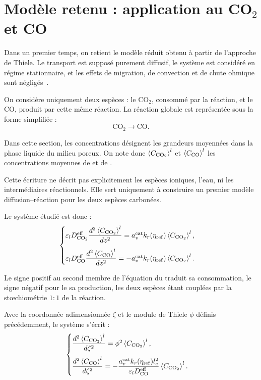 \section*{Modèle retenu : application au CO$_2$ et CO}

Dans un premier temps, on retient le modèle réduit obtenu à partir de
l'approche de Thiele. Le transport est supposé purement diffusif, le
système est considéré en régime stationnaire, et les effets de migration,
de convection et de chute ohmique sont négligés~\cite{blakeAnalyticalModellingCO2021}.

On considère uniquement deux espèces : le CO$_2$, consommé par la
réaction, et le CO, produit par cette même réaction. La réaction globale
est représentée sous la forme simplifiée :
\begin{equation}
\mathrm{CO_2 \longrightarrow CO}.
\end{equation}

Dans cette section, les concentrations désignent les grandeurs moyennées
dans la phase liquide du milieu poreux. On note donc
$\left\langle C_{\ce{CO2}}\right\rangle^l$ et
$\left\langle C_{\ce{CO}}\right\rangle^l$ les concentrations moyennes de
 et de .

Cette écriture ne décrit pas explicitement les espèces ioniques, l'eau,
ni les intermédiaires réactionnels. Elle sert uniquement à construire un
premier modèle diffusion--réaction pour les deux espèces carbonées.

Le système étudié est donc :
\begin{equation}
\begin{cases}
\varepsilon_l D_{\ce{CO2}}^{\mathrm{eff}}
\dfrac{d^2 \left\langle C_{\ce{CO2}}\right\rangle^l}{dz^2}
=
a_v^{\mathrm{cat}}
k_r(\eta_{\mathrm{ref}})
\left\langle C_{\ce{CO2}}\right\rangle^l,
\\[0.4cm]
\varepsilon_l D_{\ce{CO}}^{\mathrm{eff}}
\dfrac{d^2 \left\langle C_{\ce{CO}}\right\rangle^l}{dz^2}
=
-
a_v^{\mathrm{cat}}
k_r(\eta_{\mathrm{ref}})
\left\langle C_{\ce{CO2}}\right\rangle^l.
\end{cases}
\end{equation}

Le signe positif au second membre de l'équation du  traduit sa
consommation, le signe négatif pour le  sa production, les deux espèces
étant couplées par la stœchiométrie $1:1$ de la réaction.

Avec la coordonnée adimensionnée $\zeta$ et le module de Thiele $\phi$
définis précédemment, le système s'écrit :
\begin{equation}
\begin{cases}
\dfrac{d^2 \left\langle C_{\ce{CO2}}\right\rangle^l}{d\zeta^2}
=
\phi^2
\left\langle C_{\ce{CO2}}\right\rangle^l,
\\[0.4cm]
\dfrac{d^2 \left\langle C_{\ce{CO}}\right\rangle^l}{d\zeta^2}
=
-
\dfrac{
a_v^{\mathrm{cat}}
k_r(\eta_{\mathrm{ref}})
l_e^2
}{
\varepsilon_l D_{\ce{CO}}^{\mathrm{eff}}
}
\left\langle C_{\ce{CO2}}\right\rangle^l.
\end{cases}
\end{equation}

